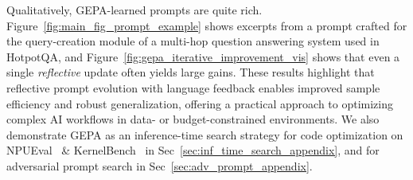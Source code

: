 \documentclass{article} %
\begin{document}
Qualitatively, GEPA-learned prompts are quite rich.
Figure~\ref{fig:main_fig_prompt_example} shows excerpts from a prompt crafted for the query-creation module of a multi-hop question answering system used in HotpotQA, and Figure~\ref{fig:gepa_iterative_improvement_vis} shows that even a single \textit{reflective} update often yields large gains.
These results highlight that reflective prompt evolution with language feedback enables improved sample efficiency and robust generalization, offering a practical approach to optimizing complex AI workflows in data- or budget-constrained environments.
We also demonstrate GEPA as an inference-time search strategy for code optimization on NPUEval~\citep{npueval} \& KernelBench~\citep{kernelbench} in Sec~\ref{sec:inf_time_search_appendix}, and for adversarial prompt search in Sec~\ref{sec:adv_prompt_appendix}.







\end{document}

